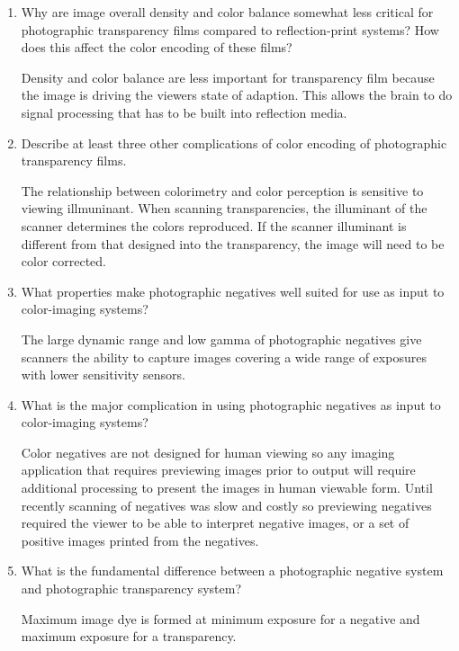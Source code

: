 \begin{enumerate}
 \item
   Why are image overall density and color balance somewhat less critical for photographic transparency films compared to reflection-print systems? How does this affect the color encoding of these films? \newline
 \par Density and color balance are less important for transparency film because the image is driving the viewers state of adaption. This allows the brain to do signal processing that has to be built into reflection media. \newline
 \item
   Describe at least three other complications of color encoding of photographic transparency films. \newline
 \par The relationship between colorimetry and color perception is sensitive to viewing illmuninant.  When scanning transparencies, the illuminant of the scanner determines the colors reproduced.  If the scanner illuminant is different from that designed into the transparency, the image will need to be color corrected.
 \item
  What properties make photographic negatives well suited for use as input to color-imaging systems? \newline
 \par The large dynamic range and low gamma of photographic negatives give scanners the ability to capture images covering a wide range of exposures with lower sensitivity sensors. \newline
 \item
 What is the major complication in using photographic negatives as input to color-imaging systems? \newline
 \par Color negatives are not designed for human viewing so any imaging application that requires previewing images prior to output will require additional processing to present the images in human viewable form.  Until recently scanning of negatives was slow and costly so previewing negatives required the viewer to be able to interpret negative images, or a set of positive images printed from the negatives. \newline
 \item
  What is the fundamental difference between a photographic negative system and photographic transparency system? \newline
 \par Maximum image dye is formed at minimum exposure for a negative and maximum exposure for a transparency. \newline

\end{enumerate}
